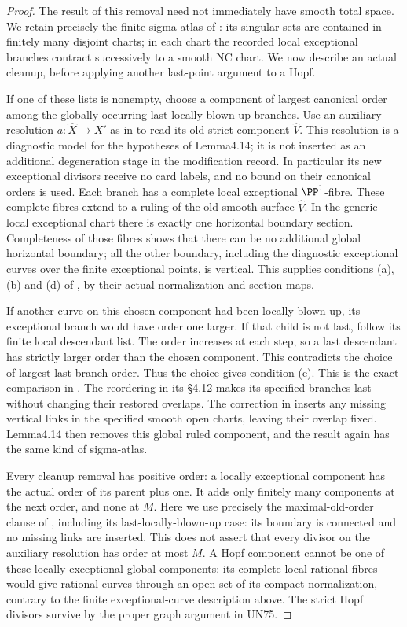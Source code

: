 \begin{proof}
The result of this removal need not immediately
have smooth total space.  We retain precisely the
finite sigma-atlas of
\cite[\S4.11.2]{Kulikov1977}: its singular sets are
contained in finitely many disjoint charts; in each
chart the recorded local exceptional branches
contract successively to a smooth NC chart.  We
now describe an actual cleanup, before applying
another last-point argument to a Hopf.

If one of these lists is nonempty, choose a
component of largest canonical order among the
globally occurring last locally blown-up branches.
Use an auxiliary resolution \(a:\widehat X\to X'\)
as in \cite[\S4.13]{Kulikov1977} to read its
old strict component \(\widehat V\).  This
resolution is a diagnostic model for the
hypotheses of Lemma4.14; it is not inserted
as an additional degeneration stage in the
modification record.  In particular its new
exceptional divisors receive no card labels,
and no bound on their canonical orders is used.
Each branch has a complete local exceptional
\(\PP^1\)-fibre.  These complete fibres extend to
a ruling of the old smooth surface
\(\widehat V\).  In the
generic local exceptional chart there is exactly
one horizontal boundary section.  Completeness
of those fibres shows that there can be no
additional global horizontal boundary; all the
other boundary, including the diagnostic
exceptional curves over the finite exceptional
points, is vertical.  This supplies
conditions (a), (b) and (d) of
\cite[Lemma4.14]{Kulikov1977}, by their actual
normalization and section maps.

If another curve on this chosen component had
been locally blown up, its exceptional branch
would have order one larger.  If that child
is not last, follow its finite local descendant
list.  The order increases at each step, so
a last descendant has strictly larger order
than the chosen component.  This contradicts
the choice of largest last-branch order.
Thus the choice gives condition
(e).  This is the exact comparison in
\cite[\S4.16.2]{Kulikov1977}.  The reordering in
its \S4.12 makes its specified branches last
without changing their restored overlaps.
The correction in \cite[\S8]{Kulikov1981}
inserts any missing vertical links in the
specified smooth open charts, leaving their
overlap fixed.  Lemma4.14 then removes this
global ruled component, and the result again
has the same kind of sigma-atlas.

Every cleanup removal has positive order:
a locally exceptional component has the
actual order of its parent plus one.  It
adds only finitely many components at the
next order, and none at \(M\).  Here we
use precisely the maximal-old-order clause
of \cite[\S8]{Kulikov1981}, including its
last-locally-blown-up case: its boundary
is connected and no missing links are
inserted.  This does not assert that
every divisor on the auxiliary resolution
has order at most \(M\).  A Hopf
component cannot be one of these locally
exceptional global components: its complete
local rational fibres would give rational
curves through an open set of its compact
normalization, contrary to the finite
exceptional-curve description above.
The strict Hopf divisors survive by the
proper graph argument in UN75.


\end{proof}
